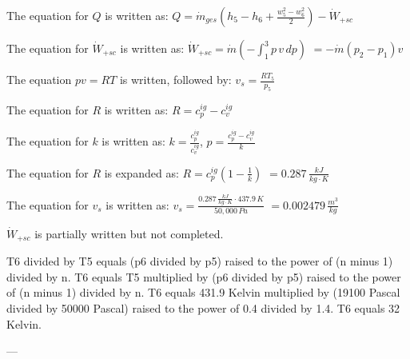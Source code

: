 The equation for \( Q \) is written as:  
\( Q = \dot{m}_{ges} \left( h_5 - h_6 + \frac{w_5^2 - w_6^2}{2} \right) - \dot{W}_{+sc} \)

The equation for \( \dot{W}_{+sc} \) is written as:  
\( \dot{W}_{+sc} = \dot{m} \left( - \int_{1}^{3} p \, v \, dp \right) \)  
\( = - \dot{m} \left( p_2 - p_1 \right) v \)

The equation \( p v = R T \) is written, followed by:  
\( v_s = \frac{R T_5}{p_5} \)

The equation for \( R \) is written as:  
\( R = c_p^{ig} - c_v^{ig} \)

The equation for \( k \) is written as:  
\( k = \frac{c_p^{ig}}{c_v^{ig}} \), \( p = \frac{c_p^{ig} - c_v^{ig}}{k} \)

The equation for \( R \) is expanded as:  
\( R = c_p^{ig} \left( 1 - \frac{1}{k} \right) \)  
\( = 0.287 \, \frac{kJ}{kg·K} \)

The equation for \( v_s \) is written as:  
\( v_s = \frac{0.287 \, \frac{kJ}{kg·K} \cdot 437.9 \, K}{50,000 \, Pa} \)  
\( = 0.002479 \, \frac{m^3}{kg} \)

\( \dot{W}_{+sc} \) is partially written but not completed.

T6 divided by T5 equals (p6 divided by p5) raised to the power of (n minus 1) divided by n.  
T6 equals T5 multiplied by (p6 divided by p5) raised to the power of (n minus 1) divided by n.  
T6 equals 431.9 Kelvin multiplied by (19100 Pascal divided by 50000 Pascal) raised to the power of 0.4 divided by 1.4.  
T6 equals 32 Kelvin.  

---